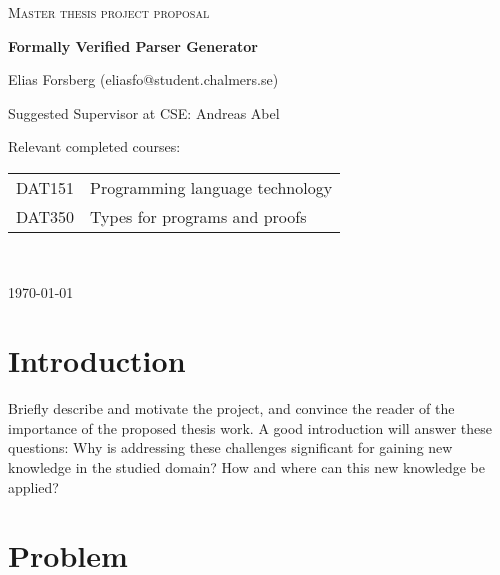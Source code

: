 \documentclass{article}
\begin{document}
\begin{titlepage}
  

\centering
  
  
{\scshape\LARGE Master thesis project proposal\\}
  
\vspace{0.5cm}
  
{\huge\bfseries Formally Verified Parser Generator\\}
  
\vspace{2cm}
  
{\Large Elias Forsberg (eliasfo@student.chalmers.se)\\}
  
\vspace{1.0cm}
  
{\large Suggested Supervisor at CSE: Andreas Abel\\}
  
\vspace{1.5cm}
  
{\large Relevant completed courses:\par}
  
{\itshape %
	\begin{tabular}{cl}
		DAT151 & Programming language technology \\
		DAT350 & Types for programs and proofs \\
	\end{tabular} \\
}
\vfill

\vfill
  
{\large \today\\} 

\end{titlepage}

\section{Introduction}

Briefly describe and motivate the project, and convince the reader of the
importance of the proposed thesis work.  A good introduction will answer these
questions: Why is addressing these challenges significant for gaining new
knowledge in the studied domain? How and where can this new knowledge be
applied?

\cite{Earley}

\section{Problem} 
\end{document}
